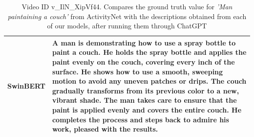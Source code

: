\begin{table}[!htbp]
\begin{tabular}{|p{2cm}p{14cm}|}
              \textbf{SwinBERT}  & A man is demonstrating how to use a spray bottle to paint a couch. He holds the spray bottle and applies the paint evenly on the couch, covering every inch of the surface. He shows how to use a smooth, sweeping motion to avoid any uneven patches or drips. The couch gradually transforms from its previous color to a new, vibrant shade. The man takes care to ensure that the paint is applied evenly and covers the entire couch. He completes the process and steps back to admire his work, pleased with the results.\\ 
             \hline
        \end{tabular}
          \caption{Video ID v\_IlN\_XipVf44. Compares the ground truth value for \textit{'Man paintaining a couch'} from ActivityNet with the descriptions obtained from each of our models, after running them through ChatGPT}
    \label{tab:table1}
\end{table}
